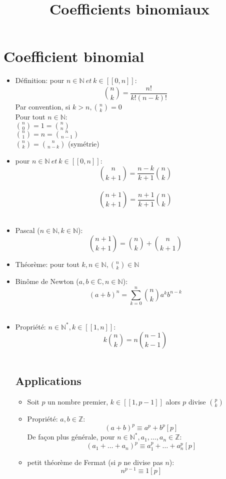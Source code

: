 \documentclass{article}
\title{Coefficients binomiaux}
\date{}
\begin{document}
\maketitle

\section{Coefficient binomial}
\begin{itemize}
	\item D\'{e}finition: pour \(n \in \mathbb{N}\ et\ k \in [\![0,n]\!]\): \\
	\[ \binom{n}{k} = \frac{n!}{k!(n-k)!} \]
	Par convention, si \(k>n, \binom{n}{k} = 0\) \\
	Pour tout \(n \in \mathbb{N}:\) \\
	\(\binom{n}{0} = 1 = \binom{n}{n}\) \\
	\(\binom{n}{1} = n = \binom{n}{n-1}\) \\
	\(\binom{n}{k} = \binom{n}{n-k}\) (sym\'{e}trie) \\
	\item pour \(n \in \mathbb{N}\ et\ k \in [\![0,n]\!]\): \\
	\[\binom{n}{k+1} = \frac{n-k}{k+1} \binom{n}{k} \] \\
	\[\binom{n+1}{k+1} = \frac{n+1}{k+1} \binom{n}{k} \] \\
	\item Pascal (\(n \in \mathbb{N}, k \in \mathbb{N}\)): \\
	\[\binom{n+1}{k+1} = \binom{n}{k} + \binom{n}{k+1}\]
	\item Th\'{e}or\`{e}me: pour tout \(k,n \in \mathbb{N}, \binom{n}{k} \in \mathbb{N}\) \\
	\item Bin\^{o}me de Newton (\(a,b \in \mathbb{C}, n \in \mathbb{N}\)): \\
	\[(a+b)^n = \sum_{k=0}^{n} \binom{n}{k}a^kb^{n-k}\] \\
	\item Propri\'{e}t\'{e}: \(n \in \mathbb{N}^*, k \in [\![1,n]\!]\): \\
	\[k\binom{n}{k} = n\binom{n-1}{k-1}\] \\
	\subsection{Applications}
	\begin{itemize}
		\item Soit \(p\) un nombre premier, \(k \in [\![1,p-1]\!]\) alors \(p\) divise \(\binom{p}{k}\) \\
		\item Propri\'{e}t\'{e}: \(a,b \in \mathbb{Z}\): \\
		\[(a+b)^p \equiv a^p + b^p [p]\]
		De fa\c{c}on plus g\'{e}n\'{e}rale, pour \(n \in \mathbb{N}^*, a_1, \hdots, a_n \in \mathbb{Z}\): \\
		\[(a_1+\hdots+a_n)^p \equiv a_1^p+\hdots+a_n^p [p]\]
		\item petit th\'{e}or\`{e}me de Fermat (si \(p\) ne divise pas \(n\)): \\
		\[n^{p-1} \equiv 1[p] \]
	\end{itemize}
\end{itemize}
\end{document}
